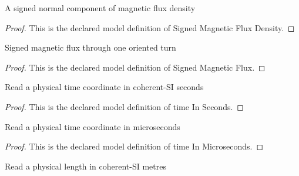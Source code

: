 \begin{definition}
  \label{def:physics:phyx-mini-0974:phyxminiproblems-problemphyxmini0974-signedmagneticfluxdensity}
  A signed normal component of magnetic flux density
\end{definition}
\begin{proof}
  This is the declared model definition of Signed Magnetic Flux Density.
\end{proof}
\begin{definition}
  \label{def:physics:phyx-mini-0974:phyxminiproblems-problemphyxmini0974-signedmagneticflux}
  Signed magnetic flux through one oriented turn
\end{definition}
\begin{proof}
  This is the declared model definition of Signed Magnetic Flux.
\end{proof}
\begin{definition}
  \label{def:physics:phyx-mini-0974:phyxminiproblems-problemphyxmini0974-timeinseconds}
  Read a physical time coordinate in coherent-SI seconds
\end{definition}
\begin{proof}
  This is the declared model definition of time In Seconds.
\end{proof}
\begin{definition}
  \label{def:physics:phyx-mini-0974:phyxminiproblems-problemphyxmini0974-timeinmicroseconds}
  Read a physical time coordinate in microseconds
\end{definition}
\begin{proof}
  This is the declared model definition of time In Microseconds.
\end{proof}
\begin{definition}
  \label{def:physics:phyx-mini-0974:phyxminiproblems-problemphyxmini0974-lengthinmeters}
  Read a physical length in coherent-SI metres
\end{definition}
